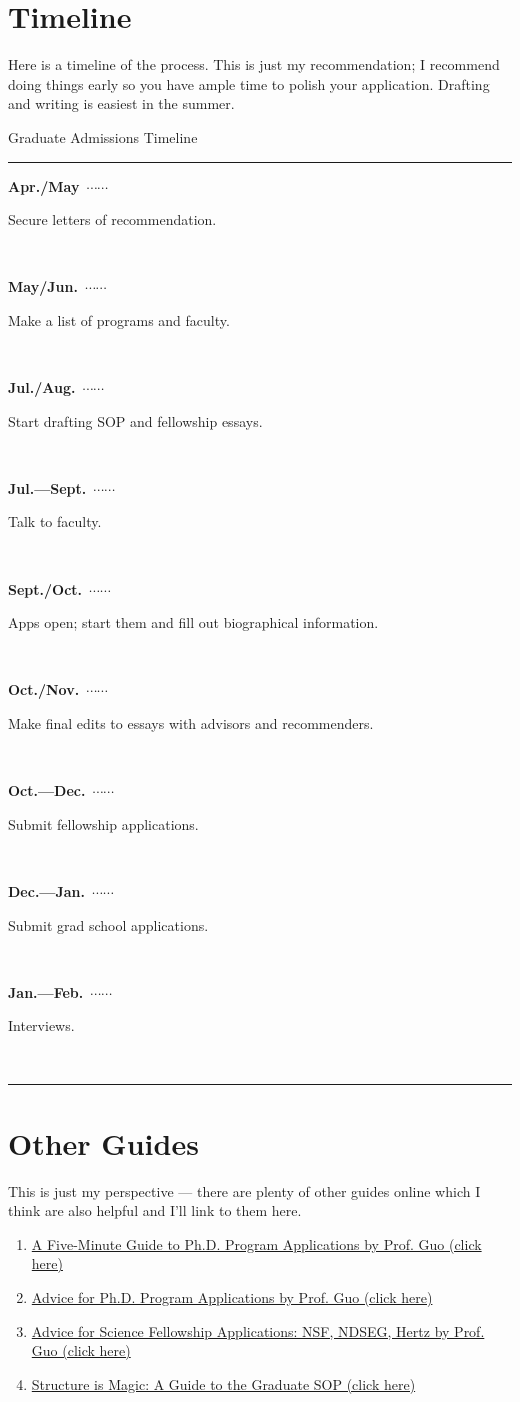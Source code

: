 \documentclass[12pt]{article}
\newcommand\ytl[2]{
\parbox[b]{8em}{\hfill{\color{Maroon}\bfseries\rmfamily #1}~$\cdots\cdots$~}\makebox[0pt][c]{$\bullet$}\vrule\quad \parbox[c]{4.5cm}{\vspace{7pt}\color{MidnightBlue}\raggedright\rmfamily #2.\\[7pt]}\\[-3pt]}
\begin{document}
\section{Timeline}
Here is a timeline of the process. This is just my recommendation; I recommend doing things early so you have ample time to polish your application. Drafting and writing is easiest in the summer.

\begin{table}[!h]
\caption{Graduate Admissions Timeline}
\centering
\begin{minipage}[t]{.7\linewidth}
\color{gray}
\rule{\linewidth}{1pt}
\ytl{Apr./May}{Secure letters of recommendation}
\ytl{May/Jun.}{Make a list of programs and faculty}
\ytl{Jul./Aug.}{Start drafting SOP and fellowship essays}
\ytl{Jul.---Sept.}{Talk to faculty}
\ytl{Sept./Oct.}{Apps open; start them and fill out biographical information}
\ytl{Oct./Nov.}{Make final edits to essays with advisors and recommenders}
\ytl{Oct.---Dec.}{Submit fellowship applications}
\ytl{Dec.---Jan.}{Submit grad school applications}
\ytl{Jan.---Feb.}{Interviews}
\bigskip
\rule{\linewidth}{1pt}%
\end{minipage}%
\end{table}

\section{Other Guides}
This is just my perspective --- there are plenty of other guides online which I think are also helpful and I'll link to them here.
\begin{enumerate}
\item \href{http://www.pgbovine.net/PhD-application-tips.htm}{A Five-Minute Guide to Ph.D. Program Applications by Prof. Guo (click here)}

\item \href{http://www.pgbovine.net/grad-school-app-tips.htm}{Advice for Ph.D. Program Applications by Prof. Guo (click here)
}

\item \href{http://www.pgbovine.net/fellowship-tips.htm}{Advice for Science Fellowship Applications: NSF, NDSEG, Hertz
 by Prof. Guo (click here)}

 \item \href{http://writeivy.com/structure-is-magic-a-guide-to-the-graduate-sop/}{Structure is Magic: A Guide to the Graduate SOP (click here)}
\end{enumerate}
\end{document}
